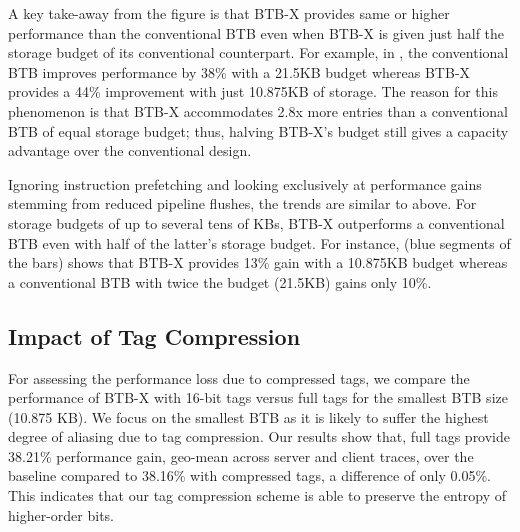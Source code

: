 A key take-away from the figure is that BTB-X provides same or higher performance than the conventional BTB even when BTB-X is given just half the storage budget of its conventional counterpart. For example, in , the conventional BTB improves performance by 38\% with a 21.5KB budget whereas BTB-X provides a 44\% improvement with just 10.875KB of storage. The reason for this phenomenon is that BTB-X accommodates 2.8x more entries than a conventional BTB of equal storage budget; thus, halving BTB-X's budget still gives a capacity advantage over the conventional design. 

Ignoring instruction prefetching and looking exclusively at performance gains stemming from reduced pipeline flushes, the trends are similar to above. 
For storage budgets of up to several tens of KBs, BTB-X outperforms a conventional BTB even with half of the latter's storage budget. For instance,  (blue segments of the bars) shows that BTB-X provides 13\% gain with a 10.875KB budget whereas a conventional BTB with twice the budget (21.5KB) gains only 10\%.

\subsection{Impact of Tag Compression}
For assessing the performance loss due to compressed tags, we compare the performance of BTB-X with 16-bit tags versus full tags for the smallest BTB size (10.875 KB). We focus on the smallest BTB as it is likely to suffer the highest degree of aliasing due to tag compression. Our results show that, full tags provide 38.21\% performance gain, geo-mean across server and client traces, over the baseline compared to 38.16\% with compressed tags, a difference of only 0.05\%. This indicates that our tag compression scheme is able to preserve the entropy of higher-order bits.
